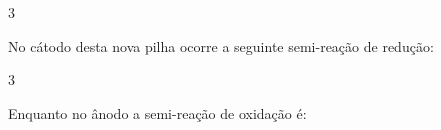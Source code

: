 \begin{questionBox}
\begin{questionBox}
    \end{questionBox}

    \begin{questionBox}3{}
        
        No cátodo desta nova pilha ocorre a seguinte semi-reação de redução:
        \begin{enumerate}[label=\alph*)]
            \begin{multicols}{2}
                \item {}
                \item {}
            \end{multicols}
        \end{enumerate}

        
    \end{questionBox}

    \begin{questionBox}3{}
        
        Enquanto no ânodo a semi-reação de oxidação é:
        \begin{enumerate}[label=\alph*)]
            \begin{multicols}{2}
                \item {}
                \item {}
            \end{multicols}
        \end{enumerate}
        

    \end{questionBox}

\end{questionBox}

